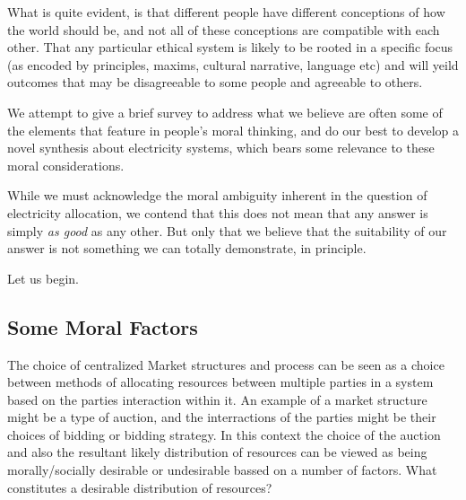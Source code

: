 What is quite evident, is that different people have different conceptions of how the world should be, and not all of these conceptions are compatible with each other.
That any particular ethical system is likely to be rooted in a specific focus (as encoded by principles, maxims, cultural narrative, language etc) and will yeild outcomes that may be disagreeable to some people and agreeable to others.


We attempt to give a brief survey to address what we believe are often some of the elements that feature in people's moral thinking, and do our best to develop a novel synthesis about electricity systems, which bears some relevance to these moral considerations.

While we must acknowledge the moral ambiguity inherent in the question of electricity allocation, we contend that this does not mean that any answer is simply \textit{as good} as any other. But only that we believe that the suitability of our answer is not something we can totally demonstrate, in principle.

Let us begin.

\subsection{Some Moral Factors}

The choice of centralized Market structures and process can be seen as a choice between methods of allocating resources between multiple parties in a system based on the parties interaction within it.
An example of a market structure might be a type of auction, and the interractions of the parties might be their choices of bidding or bidding strategy.
In this context the choice of the auction and also the resultant likely distribution of resources can be viewed as being morally/socially desirable or undesirable bassed on a number of factors.
What constitutes a desirable distribution of resources?


